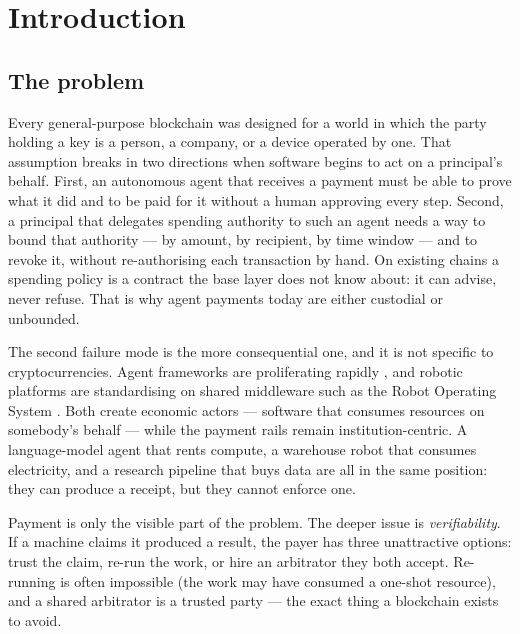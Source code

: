 \documentclass{article}
\begin{document}

\clearpage
\section{Introduction}
\label{sec:intro}

\subsection{The problem}

Every general-purpose blockchain was designed for a world in which the party
holding a key is a person, a company, or a device operated by one. That
assumption breaks in two directions when software begins to act on a principal's
behalf. First, an autonomous agent that receives a payment must be able to prove
what it did and to be paid for it without a human approving every step. Second,
a principal that delegates spending authority to such an agent needs a way to
bound that authority --- by amount, by recipient, by time window --- and to
revoke it, without re-authorising each transaction by hand. On existing chains a
spending policy is a contract the base layer does not know about: it can advise,
never refuse. That is why agent payments today are either custodial or
unbounded.

The second failure mode is the more consequential one, and it is not specific to
cryptocurrencies. Agent frameworks are proliferating rapidly \cite{sutton2019bitter,
yao2023survey,wang2023autogpt,yang2024sweagent}, and robotic platforms are
standardising on shared middleware such as the Robot Operating System
\cite{quan2021ros}. Both create economic actors --- software that consumes
resources on somebody's behalf --- while the payment rails remain
institution-centric. A language-model agent that rents compute, a warehouse
robot that consumes electricity, and a research pipeline that buys data are all
in the same position: they can produce a receipt, but they cannot enforce one.

Payment is only the visible part of the problem. The deeper issue is
\emph{verifiability}. If a machine claims it produced a result, the payer has
three unattractive options: trust the claim, re-run the work, or hire an
arbitrator they both accept. Re-running is often impossible (the work may have
consumed a one-shot resource), and a shared arbitrator is a trusted party --- the
exact thing a blockchain exists to avoid.
\end{document}
